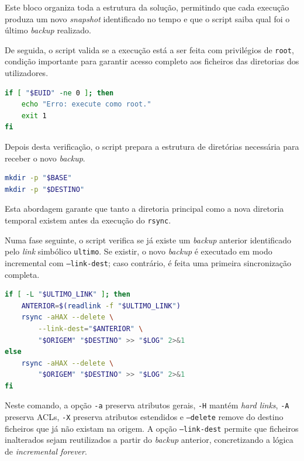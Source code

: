 Este bloco organiza toda a estrutura da solu\c{c}\~ao, permitindo que cada execu\c{c}\~ao produza um novo \textit{snapshot} identificado no tempo e que o script saiba qual foi o \'{u}ltimo \textit{backup} realizado.

De seguida, o script valida se a execu\c{c}\~ao est\'a a ser feita com privil\'egios de \texttt{root}, condi\c{c}\~ao importante para garantir acesso completo aos ficheiros das diretorias dos utilizadores.

\begin{lstlisting}[language=bash,caption={Validacao de privilegios na execucao do rsync}]
if [ "$EUID" -ne 0 ]; then
    echo "Erro: execute como root."
    exit 1
fi
\end{lstlisting}

Depois desta verifica\c{c}\~ao, o script prepara a estrutura de diret\'orias necess\'aria para receber o novo \textit{backup}.

\begin{lstlisting}[language=bash,caption={Criacao da estrutura base do backup}]
mkdir -p "$BASE"
mkdir -p "$DESTINO"
\end{lstlisting}

Esta abordagem garante que tanto a diretoria principal como a nova diretoria temporal existem antes da execu\c{c}\~ao do \texttt{rsync}.

Numa fase seguinte, o script verifica se j\'a existe um \textit{backup} anterior identificado pelo \textit{link} simb\'olico \texttt{ultimo}. Se existir, o novo \textit{backup} \'{e} executado em modo incremental com \texttt{--link-dest}; caso contr\'ario, \'{e} feita uma primeira sincroniza\c{c}\~ao completa.

\begin{lstlisting}[language=bash,caption={Execucao do backup com rsync}]
if [ -L "$ULTIMO_LINK" ]; then
    ANTERIOR=$(readlink -f "$ULTIMO_LINK")
    rsync -aHAX --delete \
        --link-dest="$ANTERIOR" \
        "$ORIGEM" "$DESTINO" >> "$LOG" 2>&1
else
    rsync -aHAX --delete \
        "$ORIGEM" "$DESTINO" >> "$LOG" 2>&1
fi
\end{lstlisting}

Neste comando, a op\c{c}\~ao \texttt{-a} preserva atributos gerais, \texttt{-H} mant\'em \textit{hard links}, \texttt{-A} preserva ACLs, \texttt{-X} preserva atributos estendidos e \texttt{--delete} remove do destino ficheiros que j\'a n\~ao existam na origem. A op\c{c}\~ao \texttt{--link-dest} permite que ficheiros inalterados sejam reutilizados a partir do \textit{backup} anterior, concretizando a l\'ogica de \textit{incremental forever}.

